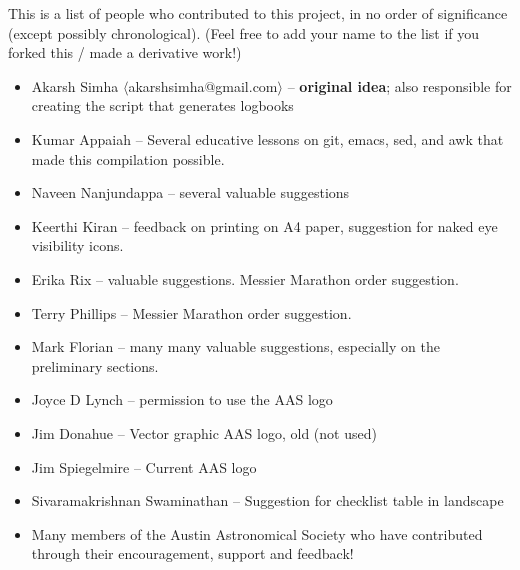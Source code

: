 This is a list of people who contributed to this project, in no order
of significance (except possibly chronological). (Feel free to add
your name to the list if you forked this / made a derivative work!)

\begin{itemize}
\item Akarsh Simha $\langle$akarshsimha@gmail.com$\rangle$ --
  \textbf{original idea}; also responsible for creating the script
  that generates logbooks
\item Kumar Appaiah -- Several educative lessons on git, emacs, sed,
  and awk that made this compilation possible.
\item Naveen Nanjundappa -- several valuable suggestions
\item Keerthi Kiran -- feedback on printing on A4 paper, suggestion
  for naked eye visibility icons.
\item Erika Rix -- valuable suggestions. Messier Marathon order
  suggestion.
\item Terry Phillips -- Messier Marathon order suggestion.
\item Mark Florian -- many many valuable suggestions, especially on
  the preliminary sections.
\item Joyce D Lynch -- permission to use the AAS logo
\item Jim Donahue -- Vector graphic AAS logo, old (not used)
\item Jim Spiegelmire -- Current AAS logo
\item Sivaramakrishnan Swaminathan -- Suggestion for checklist table
  in landscape
\item Many members of the Austin Astronomical Society who have
  contributed through their encouragement, support and feedback!
\end{itemize}
